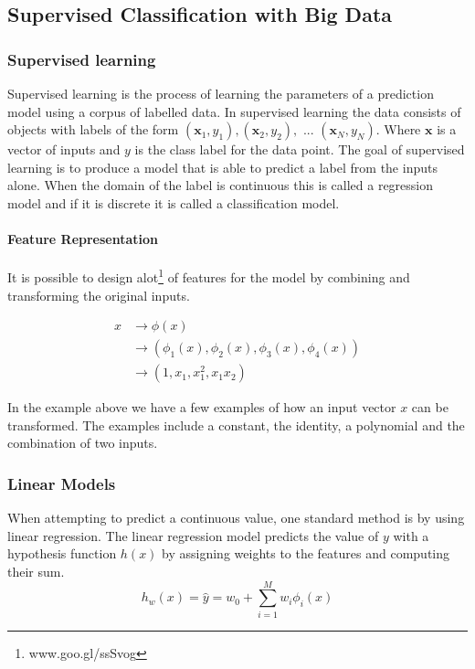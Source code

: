 \subsection{Supervised Classification with Big Data}
\label{sec:supervisedclassification}


\subsubsection{Supervised learning}
Supervised learning is the process of learning the parameters of a prediction model using a corpus of labelled data.
In supervised learning the data consists of objects with labels of the form 
$(\textbf{x}_1,y_1),(\textbf{x}_2,y_2), \text{ ... } (\textbf{x}_N,y_N)$.
Where $\textbf{x}$ is a vector of inputs and $y$ is the class label for the data point.
The goal of supervised learning is to produce a model that is able to predict a label from the inputs alone.
When the domain of the label is continuous this is called a regression model and if it is discrete it is called a classification model.

\paragraph{Feature Representation}\label{sec:phi}
It is possible to design alot\footnote{www.goo.gl/ssSvog} of features for the model by combining and transforming the original inputs.

\begin{align*}
x &\rightarrow \phi(x) \\
&\rightarrow (\phi_1(x), \phi_2(x), \phi_3(x), \phi_4(x)) \\
&\rightarrow (1, x_1, x_1^2, x_1x_2)
\end{align*} 

In the example above we have a few examples of how an input vector $x$ can be transformed.
The examples include a constant, the identity, a polynomial and the combination of two inputs.

\subsubsection{Linear Models}

When attempting to predict a continuous value, one standard method is by using linear regression.
The linear regression model predicts the value of $y$ with a hypothesis function $h(x)$ by assigning weights to the features and computing their sum.
$$h_w(x) = \hat{y} = w_0 + \sum_{i=1}^M w_i \phi_i(x)$$ 

